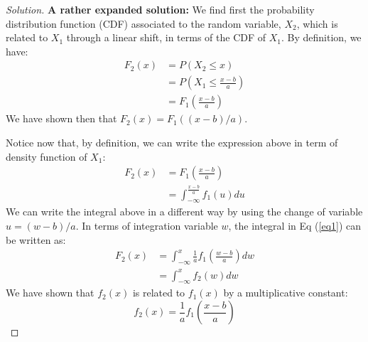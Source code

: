 \documentclass{article}
\newenvironment{solution}{\begin{proof}[Solution]}{\end{proof}}
\begin{document}
\begin{solution}
	
    \item {\bf A rather expanded solution:} We find first the probability distribution function (CDF) associated to the random variable, $X_2$, which is related to $X_1$ through a linear shift, in terms of the CDF of $X_1$.  By definition, we have:
    \begin{align}
      F_2(x) &= P(X_2 \leq x) \nonumber \\
             &= P(X_1 \leq \frac{x - b}{a}) \nonumber \\
             &= F_1\left( \frac{x - b}{a} \right)
    \end{align}
    We have shown then that $F_2(x) = F_1 ( (x - b)/a )$.
    \smallskip

    Notice now that, by definition, we can write the expression above in term of density function of $X_1$:
    \begin{align}
      F_2(x) &= F_1\left( \frac{x - b}{a} \right) \nonumber \\
             &= \int_{-\infty}^{\frac{x - b}{a}} f_1(u) du
      \label{eq1}         
    \end{align}
    We can write the integral above in a different way by using the change of variable $u = (w-b)/a$. In terms of integration variable $w$, the integral in Eq (\ref{eq1}) can be written as:
    \begin{align}
      F_2(x) &= \int_{-\infty}^x \frac{1}{a} f_1\left (\frac{w - b}{a} \right) dw \nonumber\\
             &= \int_{-\infty}^x f_2(w) dw 
    \end{align}
    We have shown that $f_2(x)$ is related to $f_1(x)$ by a multiplicative constant:
    \begin{equation}
      f_2(x) = \frac{1}{a} f_1\left (\frac{x - b}{a} \right)
    \end{equation}
    \smallskip
    

\end{solution}
\end{document}

